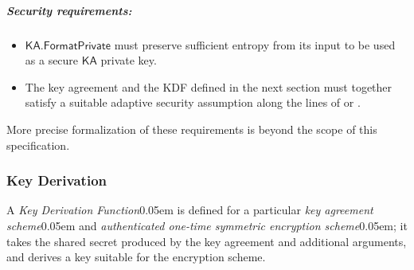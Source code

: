 \documentclass{article}
\let\oldcite\cite
\renewcommand{\cite}[2][]{\raisebox{0ex}{\oldcite[{#1}]{#2}}}
\newcommand{\introlist}{\needspace{15ex}}
\numberwithin{theorem}{subsection}
\newcommand{\term}[1]{\textsl{#1}\kern 0.05em\xspace}
\newcommand{\titleterm}[1]{#1}
\newcommand{\keyAgreementScheme}{\term{key agreement scheme}}
\newcommand{\keyDerivationFunction}{\term{Key Derivation Function}}
\newcommand{\KeyDerivation}{\titleterm{Key Derivation}}
\newcommand{\symmetricEncryptionScheme}{\term{authenticated one-time symmetric encryption scheme}}
\newcommand{\KA}{\mathsf{KA}}
\newcommand{\KAFormatPrivate}{\KA\mathsf{.FormatPrivate}}
\newenvironment{securityrequirements}{\introlist\subparagraph{Security requirements:}\begin{itemize}}{\end{itemize}}
\begin{document}
\vspace{-2ex}
\begin{securityrequirements}
  \item $\KAFormatPrivate$ must preserve sufficient entropy from its input to be used
        as a secure $\KA$ private key.
  \item The key agreement and the KDF defined in the next section must together
        satisfy a suitable adaptive security assumption along the lines of
        \cite[section 3]{Bernstein2006} or \cite[Definition 3]{ABR1999}.
\end{securityrequirements}

More precise formalization of these requirements is beyond the scope of this
specification.


\subsubsection{\KeyDerivation} \label{abstractkdf}

A \keyDerivationFunction is defined for a particular \keyAgreementScheme and
\symmetricEncryptionScheme; it takes the shared secret produced by the key
agreement and additional arguments, and derives a key suitable for the encryption
scheme.
\end{document}
